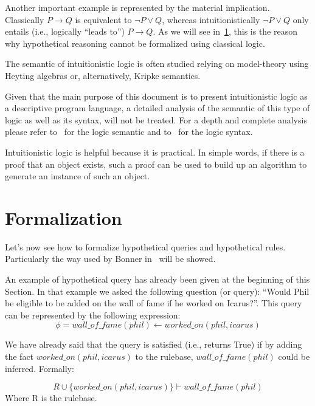 Another important example is represented by the material implication.
Classically $P \to Q$ is equivalent to $\lnot P \lor Q$, whereas intuitionistically
$\lnot P \lor Q$ only entails (i.e., logically ``leads to'') $P \to Q$.
As we will see in~\ref{sec:formalization}, this is the reason why hypothetical reasoning
cannot be formalized using classical logic.

The semantic of intuitionistic logic is often studied relying on model-theory
using Heyting algebras or, alternatively, Kripke semantics.

Given that the main purpose of this document is to present
intuitionistic logic as a descriptive program language, a detailed analysis of the semantic
of this type of logic  as well as its syntax, will not be treated. For a depth and complete analysis please refer
to~\cite{Kripke1963-KRISAO-2} for the logic semantic and to~\cite{Dirk} for the logic syntax.

Intuitionistic logic is helpful because it is practical. In simple words, if there is
a proof that an object exists, such a proof can be used to build up an algorithm to
generate an instance of such an object.

\section{Formalization}
\label{sec:formalization}
Let's now see how to formalize hypothetical queries and hypothetical rules.
Particularly the way used by Bonner in~\cite{Bonner88alogic} will be showed.

An example of hypothetical query has already been given at the beginning of this Section.
In that example we asked the following question (or query): ``Would Phil be eligible to
be added on the wall of fame if he worked on Icarus?''. This query
can be represented by the following expression:
\begin{equation}
  \phi = wall\_of\_fame(phil) \leftarrow worked\_on(phil, icarus)
\end{equation}

We have already said that the query is satisfied (i.e., returns True) if by
adding the fact $worked\_on(phil, icarus)$ to the rulebase,  $wall\_of\_fame(phil)$ could
be inferred. Formally:

\begin{equation}
  R \cup \{worked\_on(phil, icarus)\} \vdash wall\_of\_fame(phil)
\end{equation}
Where R is the rulebase.

